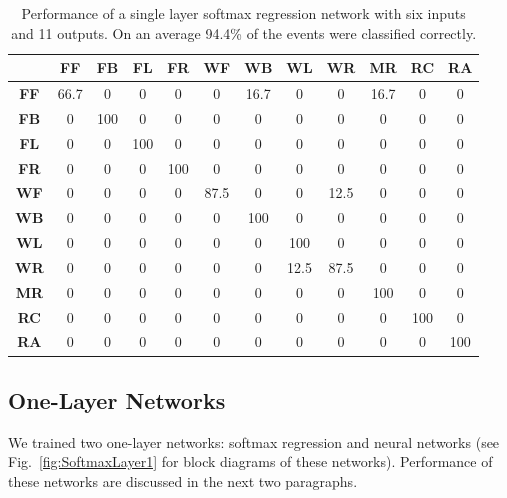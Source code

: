 \documentclass[]{IEEEtran}
\begin{document}
\begin{table}[htb]
\caption{Performance of a single layer softmax regression network with six
inputs and 11 outputs. On an average 94.4\% of the events were classified
correctly.} \label{tab:softmaxOnelayer}
\resizebox{\columnwidth}{!}
{
\begin{tabular}{|c|c|c|c|c|c|c|c|c|c|c|c|}
\hline 
& \textbf{FF} & \textbf{FB}  & \textbf{FL} & \textbf{FR} &  \textbf{WF} & 
\textbf{WB} & \textbf{WL} & \textbf{WR} & \textbf{MR} & 
\textbf{RC} & \textbf{RA} \\ \hline
\textbf{FF} & 66.7 &  0 &  0 &  0 &  0 &  16.7 &  0 &  0 &  16.7 &  0 &  0 \\ \hline
\textbf{FB} & 0 &  100 &  0 &  0 &  0 &  0 &  0 &  0 &  0 &  0 &  0 \\ \hline
\textbf{FL} & 0 &  0 &  100 &  0 &  0 &  0 &  0 &  0 &  0 &  0 &  0 \\ \hline
\textbf{FR} & 0 &  0 &  0 &  100 &  0 &  0 &  0 &  0 &  0 &  0 &  0 \\ \hline
\textbf{WF} & 0 &  0 &  0 &  0 &  87.5 &  0 &  0 &  12.5 &  0 &  0 &  0 \\ \hline
\textbf{WB} & 0 &  0 &  0 &  0 &  0 &  100 &  0 &  0 &  0 &  0 &  0 \\ \hline
\textbf{WL} & 0 &  0 &  0 &  0 &  0 &  0 &  100 &  0 &  0 &  0 &  0 \\ \hline
\textbf{WR} & 0 &  0 &  0 &  0 &  0 &  0 &  12.5 &  87.5 &  0 &  0 &  0 \\ \hline
\textbf{MR} & 0 &  0 &  0 &  0 &  0 &  0 &  0 &  0 &  100 &  0 &  0 \\ \hline
\textbf{RC} & 0 &  0 &  0 &  0 &  0 &  0 &  0 &  0 &  0 &  100 &  0 \\ \hline
\textbf{RA} & 0 &  0 &  0 &  0 &  0 &  0 &  0 &  0 &  0 &  0 &  100 \\ \hline
\end{tabular}
}
\end{table}


\subsection{One-Layer Networks} \label{sec:SingleLayerNetworks} We  trained two
one-layer networks: softmax regression and neural networks (see
Fig.~\ref{fig:SoftmaxLayer1} for block diagrams of these networks). Performance
of these networks are discussed in the next two paragraphs.
 
\end{document}
